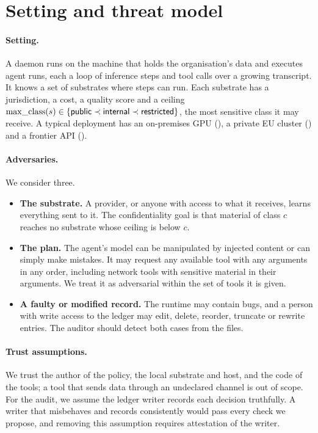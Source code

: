 \section{Setting and threat model}
\label{sec:threat}

\paragraph{Setting.} A daemon runs on the machine that holds the organisation's data and
executes agent runs, each a loop of inference steps and tool calls over a growing transcript.
It knows a set of substrates where steps can run. Each substrate has a jurisdiction, a cost, a
quality score and a ceiling $\operatorname{max\_class}(s) \in \{\textsf{public} \prec \textsf{internal} \prec \textsf{restricted}\}$, the most sensitive
class it may receive. A typical deployment has an on-premises GPU (\res), a private EU cluster
(\inte) and a frontier API (\pub).

\paragraph{Adversaries.} We consider three.
\begin{itemize}
  \item \textbf{The substrate.} A provider, or anyone with access to what it receives, learns
    everything sent to it. The confidentiality goal is that material of class $c$ reaches no
    substrate whose ceiling is below $c$.
  \item \textbf{The plan.} The agent's model can be manipulated by injected content or can
    simply make mistakes. It may request any available tool with any arguments in any order,
    including network tools with sensitive material in their arguments. We treat it as
    adversarial within the set of tools it is given.
  \item \textbf{A faulty or modified record.} The runtime may contain bugs, and a person with
    write access to the ledger may edit, delete, reorder, truncate or rewrite entries. The
    auditor should detect both cases from the files.
\end{itemize}

\paragraph{Trust assumptions.} We trust the author of the policy, the local substrate and host,
and the code of the tools; a tool that sends data through an undeclared channel is out of
scope. For the audit, we assume the ledger writer records each decision truthfully. A writer
that misbehaves and records consistently would pass every check we propose, and removing this
assumption requires attestation of the writer.

